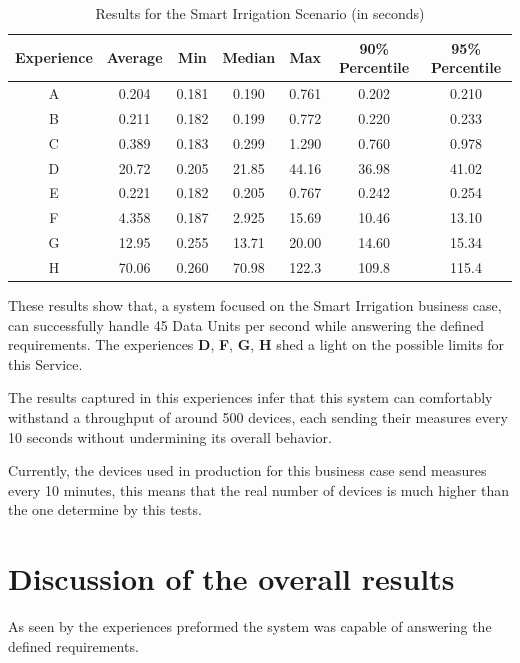 \begin{table}[H]
    \caption{Results for the Smart Irrigation Scenario (in seconds)}
    \label{tab:evaluation:experiences:irrigation:results}
    \centering
    \begin{tabular}{@{}ccccccc@{}}
    \toprule
    \textbf{Experience} & \textbf{Average} & \textbf{Min} & \textbf{Median} & \textbf{Max} & \textbf{90\% Percentile} & \textbf{95\% Percentile} \\ \midrule
    A & 0.204 & 0.181 & 0.190 & 0.761 & 0.202 & 0.210 \\ \midrule
    B & 0.211 & 0.182 & 0.199 & 0.772 & 0.220 & 0.233 \\ \midrule
    C & 0.389 & 0.183 & 0.299 & 1.290 & 0.760 & 0.978 \\ \midrule
    D & 20.72 & 0.205 & 21.85 & 44.16 & 36.98 & 41.02 \\ \midrule
    E & 0.221 & 0.182 & 0.205 & 0.767 & 0.242 & 0.254 \\ \midrule
    F & 4.358 & 0.187 & 2.925 & 15.69 & 10.46 & 13.10 \\ \midrule
    G & 12.95 & 0.255 & 13.71 & 20.00 & 14.60 & 15.34 \\ \midrule
    H & 70.06 & 0.260 & 70.98 & 122.3 & 109.8 & 115.4 \\ \bottomrule
    \end{tabular}
\end{table}

These results show that, a system focused on the Smart Irrigation business case, can successfully handle 45 Data Units per second while answering the defined requirements. The experiences \textbf{D}, \textbf{F}, \textbf{G}, \textbf{H} shed a light on the possible limits for this Service.

The results captured in this experiences infer that this system can comfortably withstand a throughput of around 500 devices, each sending their measures every 10 seconds without undermining its overall behavior.

Currently, the devices used in production for this business case send measures every 10 minutes, this means that the real number of devices is much higher than the one determine by this tests.

\section{Discussion of the overall results}
\label{subsubsec:evaluation:overview}

As seen by the experiences preformed the system was capable of answering the defined requirements.

